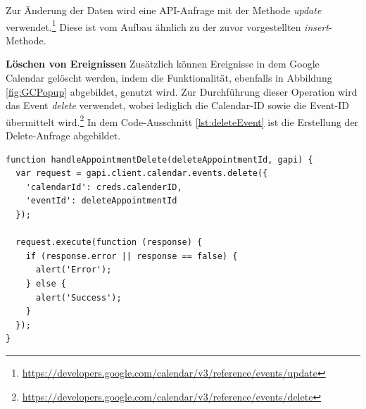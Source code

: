 Zur Änderung der Daten wird eine \ac{API}-Anfrage mit der Methode \textit{update} verwendet.\footnote{\url{https://developers.google.com/calendar/v3/reference/events/update}} 
Diese ist vom Aufbau ähnlich zu der zuvor vorgestellten \textit{insert}-Methode.

\textbf{Löschen von Ereignissen}\newline
Zusätzlich können Ereignisse in dem Google Calendar gelöscht werden, indem die Funktionalität, ebenfalls in Abbildung \vref{fig:GCPopup} abgebildet, genutzt wird. 
Zur Durchführung dieser Operation wird das Event \textit{delete} verwendet, wobei lediglich die Calendar-ID sowie die Event-ID übermittelt wird.\footnote{\url{https://developers.google.com/calendar/v3/reference/events/delete}}   
In dem Code-Ausschnitt \vref{lst:deleteEvent} ist die Erstellung der Delete-Anfrage abgebildet.

\lstset{language=JavaScript}
\begin{lstlisting}[caption={Anfrage zum Löschen eines Ereignisses}, label={lst:deleteEvent}]
function handleAppointmentDelete(deleteAppointmentId, gapi) {
  var request = gapi.client.calendar.events.delete({
    'calendarId': creds.calenderID,
    'eventId': deleteAppointmentId
  });

  request.execute(function (response) {
    if (response.error || response == false) {
      alert('Error');
    } else {
      alert('Success');
    }
  });
}
\end{lstlisting}


